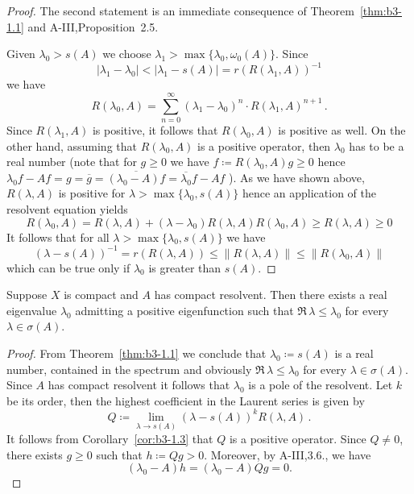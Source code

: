 \begin{proof}
	The second statement is an immediate consequence of Theorem~\ref{thm:b3-1.1} and A-III,Proposition~2.5.
	
	Given $\lambda_0 > s(A)$ we choose $\lambda_1 > \max\{\lambda_0,\omega_{0}(A)\}$.
	Since 
	\[
	\text{$|\lambda_1 - \lambda_0| < |\lambda_1 - s(A)| = r(R(\lambda_1,A))^{-1}$}
	\]
	we have
	\begin{equation}\label{eq:b3-1.10}
		R(\lambda_0,A) = \sum_{n=0}^{\infty} (\lambda_1 - \lambda_0)^n \cdot R(\lambda_1,A)^{n+1}\,.
	\end{equation}
	Since $R(\lambda_1,A)$ is positive, it follows that $R(\lambda_0,A)$ is positive as well.
	On the other hand, assuming that $R(\lambda_0,A)$ is a positive operator, then $\lambda_0$ has to be a real number (note that for $g \geq 0$ we have $f \coloneqq R(\lambda_0,A)g \geq 0$ hence $\lambda_0f - Af = g = \overline{g} = \overline{(\lambda_0 - A)f} = \overline{\lambda_0}f - Af$ ).
	As we have shown above, $R(\lambda,A)$ is positive for $\lambda > \max\{\lambda_0,s(A)\}$ hence an application of the resolvent equation yields
	\begin{equation}\label{eq:b3-1.11}
		R(\lambda_0,A) = R(\lambda,A) + (\lambda - \lambda_0)R(\lambda,A)R(\lambda_0,A) \geq R(\lambda,A) \geq 0
	\end{equation}
%
%
	It follows that for all $\lambda > \max\{\lambda_{0},s(A)\}$ we have
	\begin{equation}\label{eq:b3-1.12}
		(\lambda - s(A))^{-1} = r(R(\lambda,A)) \leq \|R(\lambda,A)\| \leq \|R(\lambda_{0},A)\|
	\end{equation}
	which can be true only if $\lambda_{0}$ is greater than $s(A)$.
\end{proof}
\begin{corollary}\label{cor:b3-1.4}
Suppose $X$ is compact and $A$ has compact resolvent.	
	Then there exists a real eigenvalue $\lambda_{0}$ admitting a positive eigenfunction such that 
	$\Re\,\lambda  \leq \lambda_{0}$ for every $\lambda \in \sigma(A)$.
\end{corollary}
\begin{proof}
	From Theorem~\ref{thm:b3-1.1} we conclude that $\lambda_{0} \coloneqq s(A)$ is a real number, contained in the spectrum and obviously $\Re\,\lambda  \leq \lambda_{0}$ for every $\lambda \in \sigma(A)$.
	Since $A$ has compact resolvent it follows that $\lambda_{0}$ is a pole of the resolvent.
	Let $k$ be its order, then the highest coefficient in the Laurent series is given by
	\begin{equation}\label{eq:b3-1.13}
		Q \coloneqq \lim_{\lambda \to s(A)} (\lambda - s(A))^{k}R(\lambda,A)\,.
	\end{equation}
It follows from Corollary~\ref{cor:b3-1.3} that $Q$ is a positive operator.
Since $Q \neq 0$, there exists $g \geq 0$ such that $h \coloneqq Qg > 0$.
Moreover, by A-III,3.6., we have 
%
\[
	 (\lambda_{0} - A)h = (\lambda_{0} - A)Qg = 0 .
\]
%
\end{proof}
